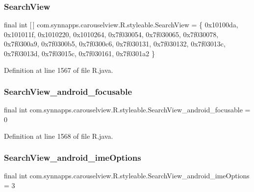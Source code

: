 \subsubsection{\texorpdfstring{SearchView}{SearchView}}
{\footnotesize\ttfamily final int \mbox{[}$\,$\mbox{]} com.\+synnapps.\+carouselview.\+R.\+styleable.\+Search\+View = \{ 0x10100da, 0x101011f, 0x1010220, 0x1010264, 0x7f030054, 0x7f030065, 0x7f030078, 0x7f0300a9, 0x7f0300b5, 0x7f0300c6, 0x7f030131, 0x7f030132, 0x7f03013c, 0x7f03013d, 0x7f03015c, 0x7f030161, 0x7f0301a2 \}\hspace{0.3cm}{\ttfamily [static]}}



Definition at line 1567 of file R.\+java.

\mbox{\label{classcom_1_1synnapps_1_1carouselview_1_1_r_1_1styleable_ae83c47f2723b80e53148432a7da36671}} 
\subsubsection{\texorpdfstring{SearchView\_android\_focusable}{SearchView\_android\_focusable}}
{\footnotesize\ttfamily final int com.\+synnapps.\+carouselview.\+R.\+styleable.\+Search\+View\+\_\+android\+\_\+focusable = 0\hspace{0.3cm}{\ttfamily [static]}}



Definition at line 1568 of file R.\+java.

\mbox{\label{classcom_1_1synnapps_1_1carouselview_1_1_r_1_1styleable_a0b3b9355e0543379487bb7eada6aa604}} 
\subsubsection{\texorpdfstring{SearchView\_android\_imeOptions}{SearchView\_android\_imeOptions}}
{\footnotesize\ttfamily final int com.\+synnapps.\+carouselview.\+R.\+styleable.\+Search\+View\+\_\+android\+\_\+ime\+Options = 3\hspace{0.3cm}{\ttfamily [static]}}



